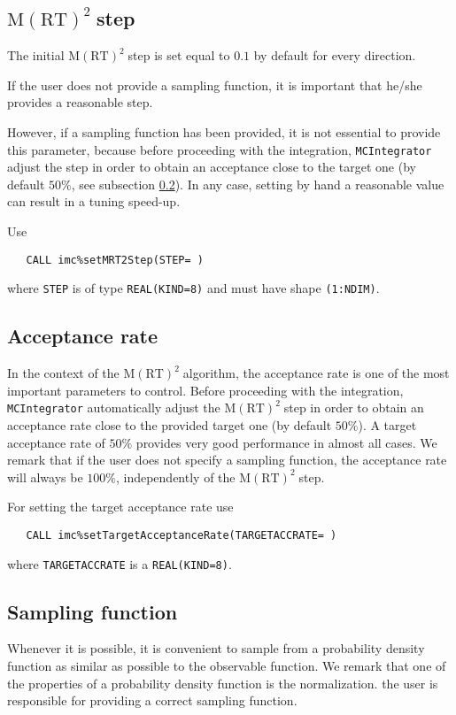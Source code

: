 \documentclass[11pt,a4paper,twoside]{article}
\newcommand{\MRTWO}{$ \text{M}(\text{RT})^2 \;$}
\begin{document}
\subsection{\MRTWO step} %
\label{sub:mrt2_step}
The initial \MRTWO step is set equal to $0.1$ by default for every direction.

If the user does not provide a sampling function, it is important that he/she provides a reasonable step.

However, if a sampling function has been provided, it is not essential to provide this parameter, because before proceeding with the integration, \verb+MCIntegrator+ adjust the step in order to obtain an acceptance close to the target one (by default $50\%$, see subsection \ref{sub:acceptance_rate}).
In any case, setting by hand a reasonable value can result in a tuning speed-up.

Use
\begin{verbatim}
   CALL imc%setMRT2Step(STEP= )
\end{verbatim}
where \verb+STEP+ is of type \verb+REAL(KIND=8)+ and must have shape \verb+(1:NDIM)+.

\subsection{Acceptance rate} %
\label{sub:acceptance_rate}
In the context of the \MRTWO algorithm, the acceptance rate is one of the most important parameters to control.
Before proceeding with the integration, \verb+MCIntegrator+ automatically adjust the \MRTWO step in order to obtain an acceptance rate close to the provided target one (by default $50\%$).
A target acceptance rate of $50\%$ provides very good performance in almost all cases.
We remark that if the user does not specify a sampling function, the acceptance rate will always be $100\%$, independently of the \MRTWO step.

For setting the target acceptance rate use
\begin{verbatim}
   CALL imc%setTargetAcceptanceRate(TARGETACCRATE= )
\end{verbatim}
where \verb+TARGETACCRATE+ is a \verb+REAL(KIND=8)+.

\subsection{Sampling function} %
\label{sub:sampling_function}
Whenever it is possible, it is convenient to sample from a probability density function as similar as possible to the observable function.
We remark that one of the properties of a probability density function is the normalization.
the user is responsible for providing a correct sampling function.
\end{document}
